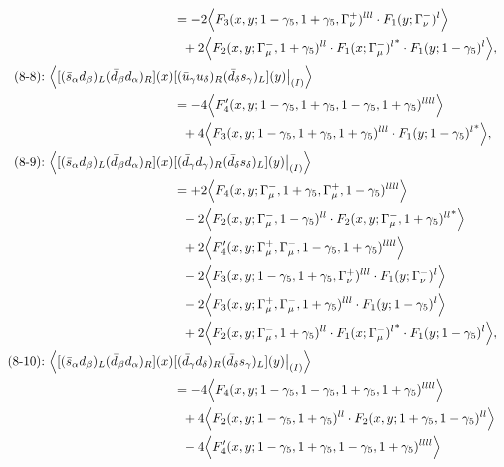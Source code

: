 \begin{align}
\notag\\*
&=
-2\Big\langle F_3(x,y;1-\gamma_5,1+\gamma_5,\Gamma_\nu^+)^{lll} \cdot F_1(y;\Gamma_\nu^-)^l\Big\rangle
\notag\\*&\ \ 
 + 2\Big\langle F_2(x,y;\Gamma_\mu^-,1+\gamma_5)^{ll} \cdot {F_1(x;\Gamma_\mu^-)^l}^* \cdot F_1(y;1-\gamma_5)^l\Big\rangle,
\\
\mbox{(8-8):}\ 
\Big\langle
[(\bar s_\alpha d_\beta)_L(\bar d_\beta d_\alpha)_R](x)&
[(\bar u_\gamma u_\delta)_R(\bar d_\delta s_\gamma)_L](y)\big|_{(I)}
\Big\rangle
\notag\\*
&=
-4\Big\langle F_4'(x,y;1-\gamma_5,1+\gamma_5,1-\gamma_5,1+\gamma_5)^{llll}\Big\rangle
\notag\\*&\ \ 
 + 4\Big\langle F_3(x,y;1-\gamma_5,1+\gamma_5,1+\gamma_5)^{lll} \cdot {F_1(y;1-\gamma_5)^l}^*\Big\rangle,
\\
\mbox{(8-9):}\ 
\Big\langle
[(\bar s_\alpha d_\beta)_L(\bar d_\beta d_\alpha)_R](x)&
[(\bar d_\gamma d_\gamma)_R(\bar d_\delta s_\delta)_L](y)\big|_{(I)}
\Big\rangle
\notag\\*
&=
 + 2\Big\langle F_4(x,y;\Gamma_\mu^-,1+\gamma_5,\Gamma_\mu^+,1-\gamma_5)^{llll}\Big\rangle
\notag\\*&\ \ 
-2\Big\langle F_2(x,y;\Gamma_\mu^-,1-\gamma_5)^{ll} \cdot {F_2(x,y;\Gamma_\mu^-,1+\gamma_5)^{ll}}^*\Big\rangle
\notag\\*&\ \ 
 + 2\Big\langle F_4'(x,y;\Gamma_\mu^+,\Gamma_\mu^-,1-\gamma_5,1+\gamma_5)^{llll}\Big\rangle
\notag\\*&\ \ 
-2\Big\langle F_3(x,y;1-\gamma_5,1+\gamma_5,\Gamma_\nu^+)^{lll} \cdot F_1(y;\Gamma_\nu^-)^l\Big\rangle
\notag\\*&\ \ 
-2\Big\langle F_3(x,y;\Gamma_\mu^+,\Gamma_\mu^-,1+\gamma_5)^{lll} \cdot F_1(y;1-\gamma_5)^l\Big\rangle
\notag\\*&\ \ 
 + 2\Big\langle F_2(x,y;\Gamma_\mu^-,1+\gamma_5)^{ll} \cdot {F_1(x;\Gamma_\mu^-)^l}^* \cdot F_1(y;1-\gamma_5)^l\Big\rangle,
\\
\mbox{(8-10):}\ 
\Big\langle
[(\bar s_\alpha d_\beta)_L(\bar d_\beta d_\alpha)_R](x)&
[(\bar d_\gamma d_\delta)_R(\bar d_\delta s_\gamma)_L](y)\big|_{(I)}
\Big\rangle
\notag\\*
&=
-4\Big\langle F_4(x,y;1-\gamma_5,1-\gamma_5,1+\gamma_5,1+\gamma_5)^{llll}\Big\rangle
\notag\\*&\ \ 
 + 4\Big\langle F_2(x,y;1-\gamma_5,1+\gamma_5)^{ll} \cdot F_2(x,y;1+\gamma_5,1-\gamma_5)^{ll}\Big\rangle
\notag\\*&\ \ 
-4\Big\langle F_4'(x,y;1-\gamma_5,1+\gamma_5,1-\gamma_5,1+\gamma_5)^{llll}\Big\rangle

\end{align}
